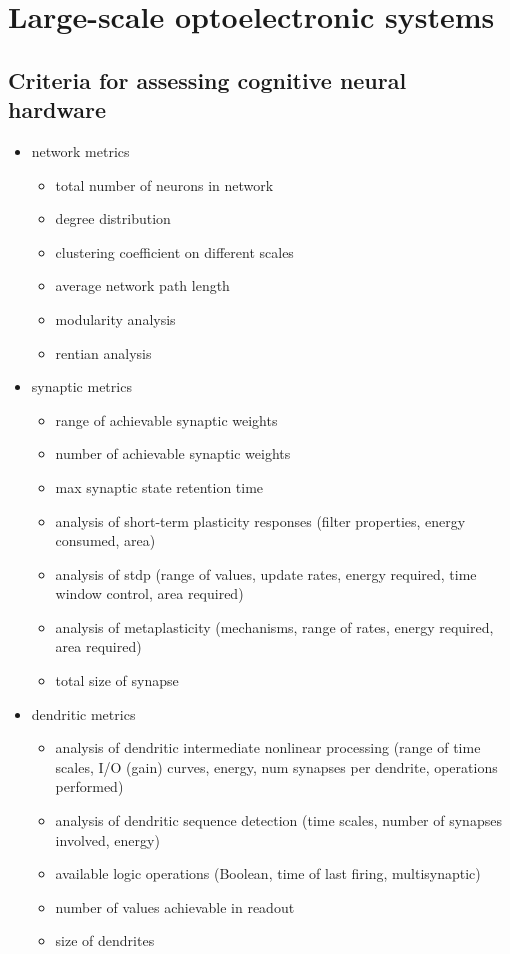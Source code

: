 \documentclass[twocolumn]{article}
\begin{document}
\section{\label{sec:scaling}Large-scale optoelectronic systems}

\subsection{Criteria for assessing cognitive neural hardware}
\begin{itemize}

\item network metrics
\begin{itemize}
\item total number of neurons in network
\item degree distribution
\item clustering coefficient on different scales
\item average network path length
\item modularity analysis
\item rentian analysis
\end{itemize}

\item synaptic metrics
\begin{itemize}
\item range of achievable synaptic weights
\item number of achievable synaptic weights
\item max synaptic state retention time
\item analysis of short-term plasticity responses (filter properties, energy consumed, area)
\item analysis of stdp (range of values, update rates, energy required, time window control, area required)
\item analysis of metaplasticity (mechanisms, range of rates, energy required, area required)
\item total size of synapse
\end{itemize}

\item dendritic metrics
\begin{itemize}
\item analysis of dendritic intermediate nonlinear processing (range of time scales, I/O (gain) curves, energy, num synapses per dendrite, operations performed)
\item analysis of dendritic sequence detection (time scales, number of synapses involved, energy)
\item available logic operations (Boolean, time of last firing, multisynaptic)
\item number of values achievable in readout
\item size of dendrites
\end{itemize}


\end{itemize}
\end{document}

